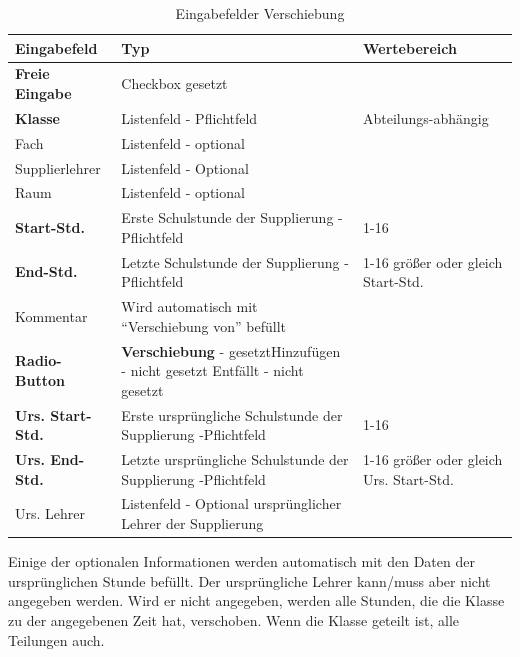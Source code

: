 \begin{table}[H]
\centering
\begin{tabular}{p{3 cm}p{6 cm}p{5 cm}}
   \toprule
   \textbf{Eingabefeld} & \textbf{Typ} & \textbf{Wertebereich} \\
   \midrule
          \textbf{Freie Eingabe} & Checkbox \newline gesetzt & \\
          \hline
          \textbf{Klasse} & Listenfeld - Pflichtfeld & Abteilungs-abhängig \\
          \hline
          Fach & Listenfeld - optional & \\
          \hline
          Supplierlehrer & Listenfeld - Optional & \\
          \hline
          Raum & Listenfeld - optional & \\
          \hline
          \textbf{Start-Std.} & Erste Schulstunde der Supplierung  -Pflichtfeld & 1-16 \\
		  \hline
          \textbf{End-Std.} & Letzte Schulstunde der Supplierung  -Pflichtfeld & 1-16 \newline größer oder gleich Start-Std.\\
          \hline
          Kommentar & Wird automatisch mit \enquote{Verschiebung von} befüllt & \\
          \hline
          \textbf{Radio-Button} & \textbf{Verschiebung} - gesetzt\newline Hinzufügen - nicht gesetzt \newline Entfällt - nicht gesetzt & \\
          \hline
          \textbf{Urs. Start-Std.} & Erste ursprüngliche Schulstunde der Supplierung  -Pflichtfeld & 1-16 \\
          \hline
          \textbf{Urs. End-Std.} & Letzte ursprüngliche Schulstunde der Supplierung  -Pflichtfeld & 1-16 \newline größer oder gleich Urs. Start-Std.\\
          \hline
          Urs. Lehrer & Listenfeld - Optional \newline ursprünglicher Lehrer der Supplierung\\
   \bottomrule
\end{tabular}
\caption{Eingabefelder Verschiebung}
\end{table}
Einige der optionalen Informationen werden automatisch mit den Daten der ursprünglichen Stunde befüllt. Der ursprüngliche Lehrer kann/muss aber nicht angegeben werden. Wird er nicht angegeben, werden alle Stunden, die die Klasse zu der angegebenen Zeit hat, verschoben. Wenn die Klasse geteilt ist, alle Teilungen auch.\\
